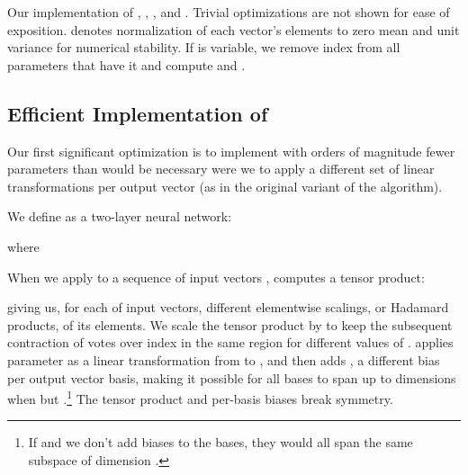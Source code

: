 \documentclass[11pt,a4paper]{article}
\begin{document}
\begin{algorithm*}[t]
	\small
	\DontPrintSemicolon
	\caption{Our implementation of , , , and . Trivial optimizations are not shown for ease of exposition.  denotes normalization of each vector's elements to zero mean and unit variance for numerical stability. If  is variable, we remove index  from all parameters that have it and compute  and .}
	\label{alg2:Efficient_Implementation}
	\BlankLine
\end{algorithm*}


\subsection{Efficient Implementation of }

Our first significant optimization is to implement  with orders of magnitude fewer parameters than would be necessary were we to apply a different set of linear transformations per output vector (as in the original variant of the algorithm).

We define  as a two-layer neural network:



where



When we apply  to a sequence of input vectors ,  computes a tensor product:



giving us, for each of  input vectors,  different elementwise scalings, or Hadamard products, of its  elements. We scale the tensor product by  to keep the subsequent contraction of votes over index  in the same region for different values of .  applies parameter  as a linear transformation from  to , and then adds , a different bias per output vector basis, making it possible for all bases to span up to  dimensions when  but .\footnote{
	If  and we don't add biases to the bases, they would all span the same subspace of dimension .
} The tensor product and per-basis biases break symmetry.
\end{document}
